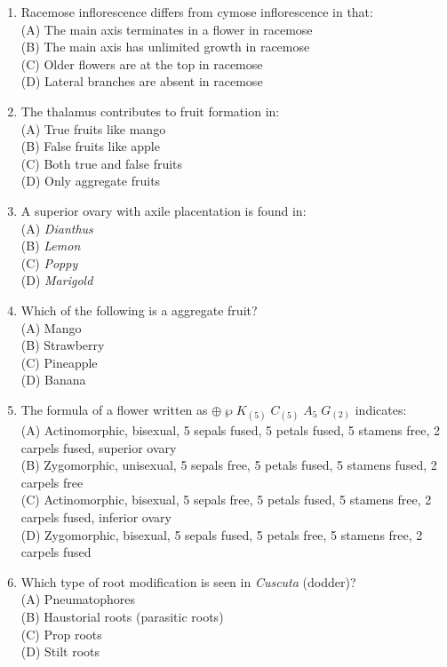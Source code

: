 \documentclass{article}
\begin{document}
\begin{enumerate}[label=Q\arabic*.]
\item Racemose inflorescence differs from cymose inflorescence in that:
\\(A) The main axis terminates in a flower in racemose
\\(B) The main axis has unlimited growth in racemose
\\(C) Older flowers are at the top in racemose
\\(D) Lateral branches are absent in racemose

\item The thalamus contributes to fruit formation in:
\\(A) True fruits like mango
\\(B) False fruits like apple
\\(C) Both true and false fruits
\\(D) Only aggregate fruits

\item A superior ovary with axile placentation is found in:
\\(A) \textit{Dianthus}
\\(B) \textit{Lemon}
\\(C) \textit{Poppy}
\\(D) \textit{Marigold}

\item Which of the following is a aggregate fruit?
\\(A) Mango
\\(B) Strawberry
\\(C) Pineapple
\\(D) Banana

\item The formula of a flower written as $\oplus \; \wp \; K_{(5)} \; C_{(5)} \; A_5 \; G_{(2)}$ indicates:
\\(A) Actinomorphic, bisexual, 5 sepals fused, 5 petals fused, 5 stamens free, 2 carpels fused, superior ovary
\\(B) Zygomorphic, unisexual, 5 sepals free, 5 petals fused, 5 stamens fused, 2 carpels free
\\(C) Actinomorphic, bisexual, 5 sepals free, 5 petals fused, 5 stamens free, 2 carpels fused, inferior ovary
\\(D) Zygomorphic, bisexual, 5 sepals fused, 5 petals free, 5 stamens free, 2 carpels fused

\item Which type of root modification is seen in \textit{Cuscuta} (dodder)?
\\(A) Pneumatophores
\\(B) Haustorial roots (parasitic roots)
\\(C) Prop roots
\\(D) Stilt roots


\end{enumerate}
\end{document}

